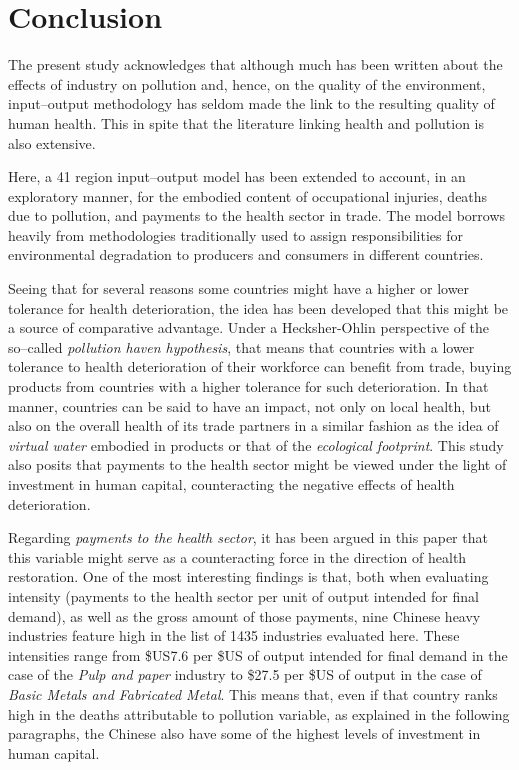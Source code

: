 \documentclass[a4paper,12pt, ]{article}
\begin{document}
\section{Conclusion}

The present study acknowledges that although much has been written about the effects of industry on pollution and, hence, on the quality of the environment, input--output methodology has seldom made the link to the resulting quality of human health. This in spite that the literature linking health and pollution is also extensive.

Here, a 41 region input--output model has been extended to account, in an exploratory manner, for the embodied content of occupational injuries, deaths due to pollution, and payments to the health sector in trade. The model borrows heavily from methodologies traditionally used to assign responsibilities for environmental degradation to producers and consumers in different countries.

Seeing that for several reasons some countries might have a higher or lower tolerance for health deterioration, the idea has been developed that this might be a source of comparative advantage. Under a Hecksher-Ohlin perspective of the so--called \textit{pollution haven hypothesis}, that means that countries with a lower tolerance to health deterioration of their workforce can benefit from trade, buying products from countries with a higher tolerance for such deterioration. In that manner, countries can be said to have an impact, not only on local health, but also on the overall health of its trade partners in a similar fashion as the idea of \textit{virtual water} embodied in products or that of the \textit{ecological footprint}. This study also posits that payments to the health sector might be viewed under the light of investment in human capital, counteracting the negative effects of health deterioration.

Regarding \textit{payments to the health sector}, it has been argued in this paper that this variable might serve as a counteracting force in the direction of health restoration. One of the most interesting findings is that, both when evaluating intensity (payments to the health sector per unit of output intended for final demand), as well as the gross amount of those payments, nine Chinese heavy industries feature high in the list of 1435 industries evaluated here. These intensities range from \$US7.6 per \$US of output intended for final demand in the case of the \textit{Pulp and paper} industry to \$27.5 per \$US of output in the case of \textit{Basic Metals and Fabricated Metal}. This means that, even if that country ranks high in the deaths attributable to pollution variable, as explained in the following paragraphs, the Chinese also have some of the highest levels of investment in human capital. 
\end{document}
